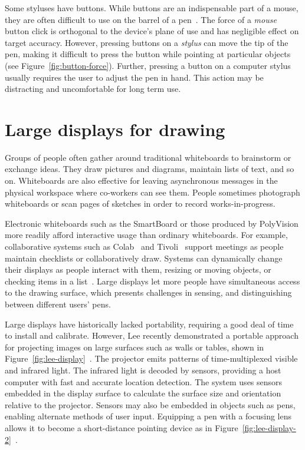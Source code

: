 Some styluses have buttons. While buttons are an indispensable part of
a mouse, they are often difficult to use on the barrel of a
pen~\cite{plimmer-pen-usability}. The force of a \textit{mouse} button
click is orthogonal to the device's plane of use and has negligible
effect on target accuracy. However, pressing buttons on a
\textit{stylus} can move the tip of the pen, making it difficult to
press the button while pointing at particular objects (see
Figure~\ref{fig:button-force}). Further, pressing a button on a
computer stylus usually requires the user to adjust the pen in
hand. This action may be distracting and uncomfortable for long term
use.

\section{Large displays for drawing}

Groups of people often gather around traditional whiteboards to
brainstorm or exchange ideas. They draw pictures and diagrams,
maintain lists of text, and so on.  Whiteboards are also effective for
leaving asynchronous messages in the physical workspace where
co-workers can see them. People sometimes photograph whiteboards or
scan pages of sketches in order to record works-in-progress.

Electronic whiteboards such as the SmartBoard or those produced by
PolyVision more readily afford interactive usage than ordinary
whiteboards. For example, collaborative systems such as
Colab~\cite{stefik-colab} and Tivoli~\cite{pedersen-tivoli} support
meetings as people maintain checklists or collaboratively
draw. Systems can dynamically change their displays as people interact
with them, resizing or moving objects, or checking items in a
list~\cite{mynatt-flatland}. Large displays let more people have
simultaneous access to the drawing surface, which presents challenges
in sensing, and distinguishing between different users' pens.

Large displays have historically lacked portability, requiring a good
deal of time to install and calibrate. However, Lee recently
demonstrated a portable approach for projecting images on large
surfaces such as walls or tables, shown in
Figure~\ref{fig:lee-display}~\cite{lee-3d-infrared-pen}. The projector
emits patterns of time-multiplexed visible and infrared light. The
infrared light is decoded by sensors, providing a host computer with
fast and accurate location detection. The system uses sensors embedded
in the display surface to calculate the surface size and orientation
relative to the projector. Sensors may also be embedded in objects
such as pens, enabling alternate methods of user input. Equipping a
pen with a focusing lens allows it to become a short-distance pointing
device as in
Figure~\ref{fig:lee-display-2}~\cite[p. 62]{lee-projector-thesis}.


